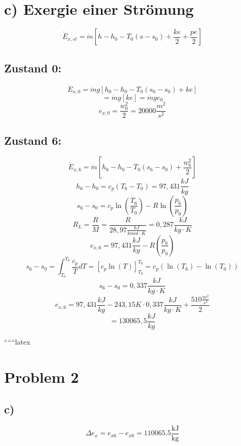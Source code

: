 \section*{c) Exergie einer Strömung}

\[
\dot{E}_{x,st} = \dot{m} \left[ h - h_0 - T_0 (s - s_0) + \frac{ke}{2} + \frac{pe}{2} \right]
\]

\subsection*{Zustand 0:}
\[
\dot{E}_{x,0} = \dot{m} g \left[ h_0 - h_0 - T_0 (s_0 - s_0) + ke \right]
\]
\[
= \dot{m} g \left[ ke \right] = \dot{m} g e_0
\]
\[
e_{x,0} = \frac{w_0^2}{2} = 20000 \frac{m^2}{s^2}
\]

\subsection*{Zustand 6:}
\[
\dot{E}_{x,6} = \dot{m} \left[ h_6 - h_0 - T_0 (s_6 - s_0) + \frac{w_6^2}{2} \right]
\]
\[
h_6 - h_0 = c_p (T_6 - T_0) = 97,431 \frac{kJ}{kg}
\]
\[
s_6 - s_0 = c_p \ln \left( \frac{T_6}{T_0} \right) - R \ln \left( \frac{p_6}{p_0} \right)
\]
\[
R_L = \frac{R}{M} = \frac{R}{28,97 \frac{kJ}{kmol \cdot K}} = 0,287 \frac{kJ}{kg \cdot K}
\]
\[
e_{x,6} = 97,431 \frac{kJ}{kg} - R \left( \frac{p_6}{p_0} \right)
\]
\[
s_6 - s_0 = \int_{T_0}^{T_6} \frac{c_p}{T} dT = \left[ c_p \ln (T) \right]_{T_0}^{T_6} = c_p \left( \ln (T_6) - \ln (T_0) \right)
\]
\[
s_6 - s_0 = 0,337 \frac{kJ}{kg \cdot K}
\]
\[
e_{x,6} = 97,431 \frac{kJ}{kg} - 243,15 K \cdot 0,337 \frac{kJ}{kg \cdot K} + \frac{510 \frac{m^2}{s^2}}{2}
\]
\[
= 130065,5 \frac{kJ}{kg}
\]

``````latex


\section*{Problem 2}



\subsection*{c)}

\[
\Delta e_x = e_{x6} - e_{x0} = 110065.5 \frac{\text{kJ}}{\text{kg}}
\]